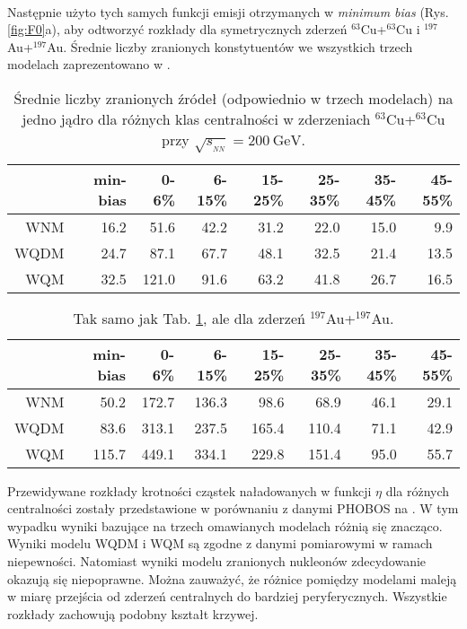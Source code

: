 \documentclass[a4paper,12pt]{article}
\begin{document}
\paragraph{}
Następnie użyto tych samych funkcji emisji otrzymanych w \textit{minimum bias} (Rys. \ref{fig:F0}a), aby odtworzyć rozkłady dla symetrycznych zderzeń $^{63}$Cu+$^{63}$Cu i $^{197}$Au+$^{197}$Au. Średnie liczby zranionych konstytuentów we wszystkich trzech modelach zaprezentowano w .

\begin{table}[H]\centering
\begin{tabular}{|r|r|r|r|r|r|r|r|} \hline
 & min-bias & 0-6\% & 6-15\% & 15-25\% & 25-35\% & 35-45\% & 45-55\% \\ \hline
WNM  & 16.2 & 51.6 & 42.2 & 31.2 & 22.0 & 15.0 & 9.9 \\ \hline
WQDM & 24.7 & 87.1 & 67.7 & 48.1 & 32.5 & 21.4 & 13.5 \\ \hline
WQM  & 32.5 & 121.0 & 91.6 & 63.2 & 41.8 & 26.7 & 16.5 \\ \hline
\end{tabular}
\caption{Średnie liczby zranionych źródeł (odpowiednio w trzech modelach) na jedno jądro dla różnych klas centralności w zderzeniach $^{63}$Cu+$^{63}$Cu przy $\sqrt{s_{_{NN}}} = 200~\text{GeV}$.}\label{table:Cu-Cu}
\end{table}
\vspace*{-0.4in}
\begin{table}[H]\centering
\begin{tabular}{|r|r|r|r|r|r|r|r|} \hline
 & min-bias & 0-6\% & 6-15\% & 15-25\% & 25-35\% & 35-45\% & 45-55\% \\ \hline
WNM  & 50.2 & 172.7 & 136.3 & 98.6 & 68.9 & 46.1 & 29.1 \\ \hline
WQDM & 83.6 & 313.1 & 237.5 & 165.4 & 110.4 & 71.1 & 42.9 \\ \hline
WQM  & 115.7 & 449.1 & 334.1 & 229.8 & 151.4 & 95.0 & 55.7 \\ \hline
\end{tabular}
\caption{Tak samo jak Tab. \ref{table:Cu-Cu}, ale dla zderzeń $^{197}$Au+$^{197}$Au.}\label{table:Au-Au}
\end{table}
\vspace*{-0.2in}

Przewidywane rozkłady krotności cząstek naładowanych w funkcji $\eta$ dla różnych centralności zostały przedstawione w porównaniu z danymi PHOBOS \cite{Alver:2007aa, Back:2002wb} na . W tym wypadku wyniki bazujące na trzech omawianych modelach różnią się znacząco. Wyniki modelu WQDM i WQM są zgodne z danymi pomiarowymi w ramach niepewności. Natomiast wyniki modelu zranionych nukleonów zdecydowanie okazują się niepoprawne. Można zauważyć, że różnice pomiędzy modelami maleją w miarę przejścia od zderzeń centralnych do bardziej peryferycznych. Wszystkie rozkłady zachowują podobny kształt krzywej.
\end{document}
